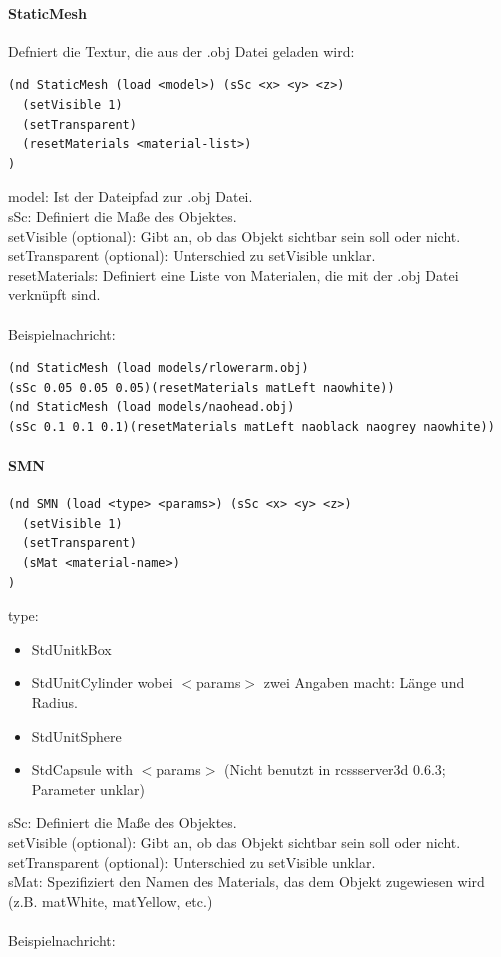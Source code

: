 \paragraph{StaticMesh}
Defniert die Textur, die aus der .obj Datei geladen wird:

\begin{verbatim}(nd StaticMesh (load <model>) (sSc <x> <y> <z>)
  (setVisible 1)
  (setTransparent)
  (resetMaterials <material-list>)
)
\end{verbatim}
model: Ist der Dateipfad zur .obj Datei.\\
sSc: Definiert die Maße des Objektes.\\
setVisible (optional): Gibt an, ob das Objekt sichtbar sein soll oder nicht.\\
setTransparent (optional): Unterschied zu setVisible unklar.\\
resetMaterials: Definiert eine Liste von Materialen, die mit der .obj Datei verknüpft sind.\\
\\
Beispielnachricht:

\begin{verbatim}(nd StaticMesh (load models/rlowerarm.obj) 
(sSc 0.05 0.05 0.05)(resetMaterials matLeft naowhite))
(nd StaticMesh (load models/naohead.obj) 
(sSc 0.1 0.1 0.1)(resetMaterials matLeft naoblack naogrey naowhite))
\end{verbatim}
\paragraph{SMN}
\begin{verbatim}(nd SMN (load <type> <params>) (sSc <x> <y> <z>)
  (setVisible 1)
  (setTransparent)
  (sMat <material-name>)
)
\end{verbatim}
type:

\begin{itemize}
\item  StdUnitkBox
\item  StdUnitCylinder wobei $<$params$>$ zwei Angaben macht: Länge und Radius.
\item  StdUnitSphere
\item  StdCapsule with $<$params$>$ (Nicht benutzt in rcssserver3d 0.6.3; Parameter unklar) 
\end{itemize}
sSc: Definiert die Maße des Objektes.\\
setVisible (optional): Gibt an, ob das Objekt sichtbar sein soll oder nicht.\\
setTransparent (optional): Unterschied zu setVisible unklar.\\
sMat: Spezifiziert den Namen des Materials, das dem Objekt zugewiesen wird (z.B. matWhite, matYellow, etc.)\\
\\
Beispielnachricht:

